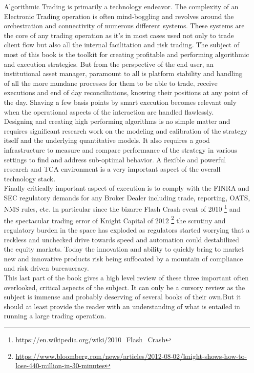 
Algorithmic Trading is primarily a technology endeavor. The complexity of an Electronic Trading operation is often mind-boggling and revolves around the orchestration and connectivity of numerous different systems. These systems are the core of any trading operation as it's in most cases used not only to trade client flow but also all the internal facilitation and risk trading. The subject of most of this book is the toolkit for creating profitable and performing algorithmic and execution strategies. But from the perspective of the end user, an institutional asset manager, paramount to all is platform stability and handling of all the more mundane processes for them to be able to trade, receive executions and end of day reconciliations, knowing their positions at any point of the day. Shaving a few basis points by smart execution becomes relevant only when the operational aspects of the interaction are handled flawlessly.\\

Designing and creating high performing algorithms is no simple matter and requires significant research work on the modeling and calibration of the strategy itself and the underlying quantitative models. It also requires a good infrastructure to measure and compare  performance of the strategy in various settings to find and address sub-optimal behavior. A flexible and powerful research and TCA environment is a very important aspect of the overall technology stack.\\

Finally critically important aspect of execution is to comply with the FINRA and SEC regulatory demands for any Broker Dealer including trade, reporting, OATS, NMS rules, etc. In particular since the bizarre Flash Crash event of 2010 \footnote{\url{https://en.wikipedia.org/wiki/2010_Flash_Crash}} and the spectacular trading error of Knight Capital of 2012 \footnote{\url{https://www.bloomberg.com/news/articles/2012-08-02/knight-shows-how-to-lose-440-million-in-30-minutes}} the scrutiny and regulatory burden in the space has exploded as regulators started worrying that a reckless and unchecked drive towards speed and automation could destabilized the equity markets. Today the innovation and ability to quickly bring to market new and innovative products risk being suffocated by a mountain of compliance and risk driven bureaucracy.\\

This last part of the book gives a high level review of these three important often overlooked, critical aspects of the subject. It can only be a cursory review as the subject is immense and probably deserving of several books of their own.But it should at least provide the reader with an understanding of what is entailed in running a large trading operation.

 

